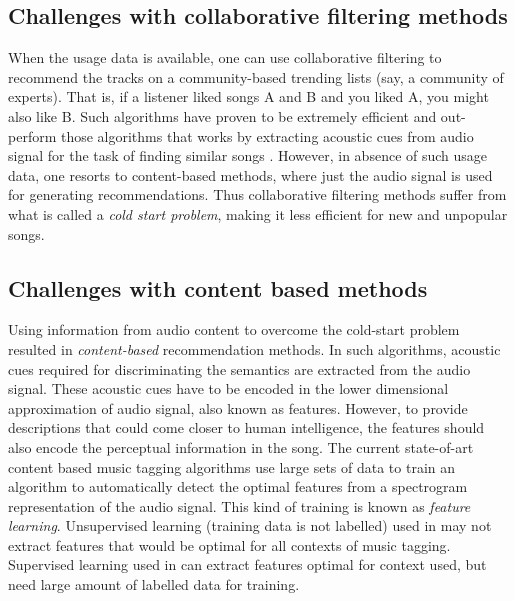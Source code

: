 \subsection{Challenges with collaborative filtering methods}
When the usage data is available, one can use collaborative filtering to recommend the tracks on a community-based trending lists (say, a community of experts). That is, if a listener liked songs A and B and you liked A, you might also like B. Such algorithms have proven to be extremely efficient and out-perform those algorithms that works by extracting acoustic cues from audio signal for the task of finding similar songs \cite{DC1}. However, in absence of such usage data, one resorts to content-based methods, where just the audio signal is used for generating recommendations. Thus collaborative filtering methods suffer from what is called a \textit{cold start problem}, making it less efficient for new and unpopular songs. 


\subsection{Challenges with content based methods}
\label{problems}
Using information from audio content to overcome the cold-start problem resulted in \textit{content-based} recommendation methods. In such algorithms, acoustic cues required for discriminating the semantics are extracted from the audio signal. These acoustic cues have to be encoded in the lower dimensional approximation of audio signal, also known as features. However, to provide descriptions that could come closer to human intelligence, the features should also encode the perceptual information in the song. The current state-of-art content based music tagging algorithms\cite{MultiScale}\cite{choi_crnn} use large sets of data to train an algorithm to automatically detect the optimal features from a spectrogram representation of the audio signal. This kind of training is known as \textit{feature learning}. Unsupervised learning (training data is not labelled) used in \cite{MultiScale} may not extract features that would be optimal for all contexts of music tagging. Supervised learning used in \cite{choi_crnn}\cite{choi_cnn} can extract features optimal for context used, but need large amount of labelled data for training.      



